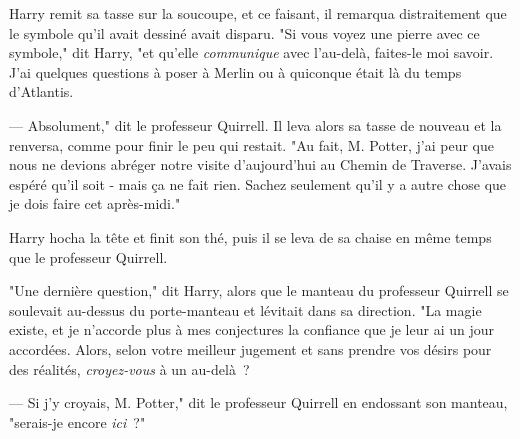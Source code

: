 Harry remit sa tasse sur la soucoupe, et ce faisant, il remarqua distraitement que le symbole qu'il avait dessiné avait disparu. "Si vous voyez une pierre avec ce symbole," dit Harry, "et qu'elle \emph{communique} avec l'au-delà, faites-le moi savoir. J'ai quelques questions à poser à Merlin ou à quiconque était là du temps d'Atlantis.

--- Absolument," dit le professeur Quirrell. Il leva alors sa tasse de nouveau et la renversa, comme pour finir le peu qui restait. "Au fait, M. Potter, j'ai peur que nous ne devions abréger notre visite d'aujourd'hui au Chemin de Traverse. J'avais espéré qu'il soit - mais ça ne fait rien. Sachez seulement qu'il y a autre chose que je dois faire cet après-midi."

Harry hocha la tête et finit son thé, puis il se leva de sa chaise en même temps que le professeur Quirrell.

"Une dernière question," dit Harry, alors que le manteau du professeur Quirrell se soulevait au-dessus du porte-manteau et lévitait dans sa direction. "La magie existe, et je n'accorde plus à mes conjectures la confiance que je leur ai un jour accordées. Alors, selon votre meilleur jugement et sans prendre vos désirs pour des réalités, \emph{croyez-vous} à un au-delà~?

--- Si j'y croyais, M. Potter," dit le professeur Quirrell en endossant son manteau, "serais-je encore \emph{ici}~?"

